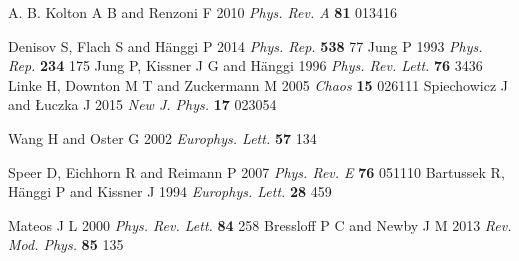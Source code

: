 \documentclass[12pt]{iopart}
\begin{document}
\begin{thebibliography}{99}
   A. B. Kolton A B and  Renzoni F 2010 \textit{ Phys. Rev.  A}  \textbf{81}  013416 

Denisov S, Flach S and H\"anggi P 2014 \textit{Phys. Rep.} \textbf{538} 77 
Jung P 1993 \textit{Phys. Rep.} \textbf{234} 175
  Jung P, Kissner J G and H\"anggi 1996 \textit{Phys. Rev. Lett.} \textbf{76} 3436
  Linke H, Downton M T and Zuckermann M 2005 \textit{Chaos} \textbf{15} 026111
Spiechowicz J and {\L}uczka J 2015 \textit{New J. Phys.} \textbf{17} 023054

 Wang H and Oster G 2002 \textit{Europhys. Lett.} \textbf{57}  134 

Speer D, Eichhorn R and Reimann P 2007 \textit{Phys. Rev. E} \textbf{76} 051110
Bartussek R, H\"anggi P and Kissner J 1994 \textit{Europhys. Lett.} \textbf{28} 459

Mateos J L 2000 \textit{Phys. Rev. Lett.} \textbf{84} 258
Bressloff P C and Newby J M 2013 \textit{Rev. Mod. Phys.} \textbf{85} 135
\end{thebibliography}
\end{document}
